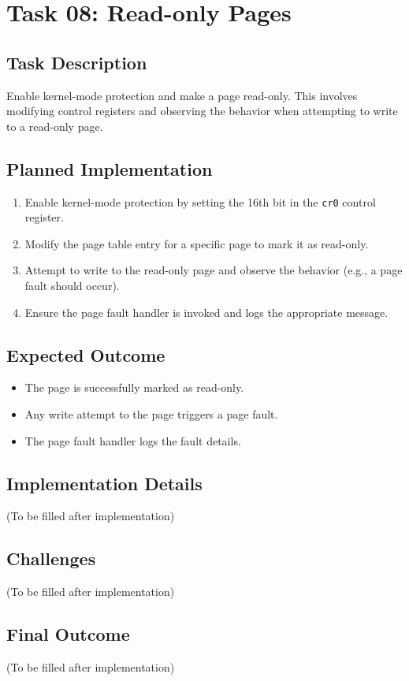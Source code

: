 \documentclass[a4paper,12pt]{report}
\begin{document}
\chapter{Task 08: Read-only Pages}

\section{Task Description}
Enable kernel-mode protection and make a page read-only. This involves modifying control registers and observing the behavior when attempting to write to a read-only page.

\section{Planned Implementation}
\begin{enumerate}
    \item Enable kernel-mode protection by setting the 16th bit in the \texttt{cr0} control register.
    \item Modify the page table entry for a specific page to mark it as read-only.
    \item Attempt to write to the read-only page and observe the behavior (e.g., a page fault should occur).
    \item Ensure the page fault handler is invoked and logs the appropriate message.
\end{enumerate}

\section{Expected Outcome}
\begin{itemize}
    \item The page is successfully marked as read-only.
    \item Any write attempt to the page triggers a page fault.
    \item The page fault handler logs the fault details.
\end{itemize}

\section{Implementation Details}
(To be filled after implementation)

\section{Challenges}
(To be filled after implementation)

\section{Final Outcome}
(To be filled after implementation)
\end{document}
